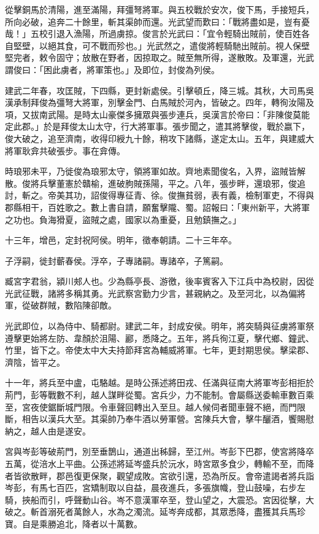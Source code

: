 \begin{pinyinscope}
從擊銅馬於清陽，進至滿陽，拜彊弩將軍。與五校戰於安次，俊下馬，手接短兵，所向必破，追奔二十餘里，斬其渠帥而還。光武望而歎曰：「戰將盡如是，豈有憂哉！」五校引退入漁陽，所過虜掠。俊言於光武曰：「宜令輕騎出賊前，使百姓各自堅壁，以絕其食，可不戰而殄也。」光武然之，遣俊將輕騎馳出賊前。視人保壁堅完者，敕令固守；放散在野者，因掠取之。賊至無所得，遂散敗。及軍還，光武謂俊曰：「困此虜者，將軍策也。」及即位，封俊為列侯。

建武二年春，攻匡賊，下四縣，更封新處侯。引擊頓丘，降三城。其秋，大司馬吳漢承制拜俊為彊弩大將軍，別擊金門、白馬賊於河內，皆破之。四年，轉徇汝陽及項，又拔南武陽。是時太山豪傑多擁眾與張步連兵，吳漢言於帝曰：「非陳俊莫能定此郡。」於是拜俊太山太守，行大將軍事。張步聞之，遣其將擊俊，戰於嬴下，俊大破之，追至濟南，收得印綬九十餘，稍攻下諸縣，遂定太山。五年，與建威大將軍耿弇共破張步。事在弇傳。

時琅邪未平，乃徙俊為琅邪太守，領將軍如故。齊地素聞俊名，入界，盜賊皆解散。俊將兵擊董憲於贛榆，進破朐賊孫陽，平之。八年，張步畔，還琅邪，俊追討，斬之。帝美其功，詔俊得專征青、徐。俊撫貧弱，表有義，檢制軍吏，不得與郡縣相干，百姓歌之。數上書自請，願奮擊隴、蜀。詔報曰：「東州新平，大將軍之功也。負海猾夏，盜賊之處，國家以為重憂，且勉鎮撫之。」

十三年，增邑，定封祝阿侯。明年，徵奉朝請。二十三年卒。

子浮嗣，徙封蘄春侯。浮卒，子專諸嗣。專諸卒，子篤嗣。

臧宮字君翁，潁川郟人也。少為縣亭長、游徼，後率賓客入下江兵中為校尉，因從光武征戰，諸將多稱其勇。光武察宮勤力少言，甚親納之。及至河北，以為偏將軍，從破群賊，數陷陳卻敵。

光武即位，以為侍中、騎都尉。建武二年，封成安侯。明年，將突騎與征虜將軍祭遵擊更始將左防、韋顏於沮陽、酈，悉降之。五年，將兵徇江夏，擊代鄉、鐘武、竹里，皆下之。帝使太中大夫持節拜宮為輔威將軍。七年，更封期思侯。擊梁郡、濟陰，皆平之。

十一年，將兵至中盧，屯駱越。是時公孫述將田戎、任滿與征南大將軍岑彭相拒於荊門，彭等戰數不利，越人謀畔從蜀。宮兵少，力不能制。會屬縣送委輸車數百乘至，宮夜使鋸斷城門限。令車聲回轉出入至旦。越人候伺者聞車聲不絕，而門限斷，相告以漢兵大至。其渠帥乃奉牛酒以勞軍營。宮陳兵大會，擊牛釃酒，饗賜慰納之，越人由是遂安。

宮與岑彭等破荊門，別至垂鵲山，通道出秭歸，至江州。岑彭下巴郡，使宮將降卒五萬，從涪水上平曲。公孫述將延岑盛兵於沅水，時宮眾多食少，轉輸不至，而降者皆欲散畔，郡邑復更保聚，觀望成敗。宮欲引還，恐為所反。會帝遣謁者將兵詣岑彭，有馬七百匹，宮矯制取以自益，晨夜進兵，多張旗幟，登山鼓噪，右步左騎，挾船而引，呼聲動山谷。岑不意漢軍卒至，登山望之，大震恐。宮因從擊，大破之。斬首溺死者萬餘人，水為之濁流。延岑奔成都，其眾悉降，盡獲其兵馬珍寶。自是乘勝追北，降者以十萬數。


\end{pinyinscope}
